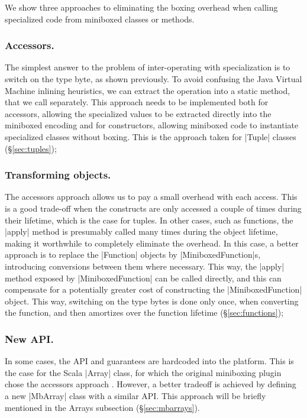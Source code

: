 \vspace{-0.25em}

We show three approaches to eliminating the boxing overhead when calling specialized code from miniboxed classes or methods.

\vspace{-0.5em}

\subsubsection{Accessors.} The simplest answer to the problem of inter-operating with specialization is to switch on the type byte, as shown previously. To avoid confusing the Java Virtual Machine inlining heuristics, we can extract the operation into a static method, that we call separately. This approach needs to be implemented both for accessors, allowing the specialized values to be extracted directly into the miniboxed encoding and for constructors, allowing miniboxed code to instantiate specialized classes without boxing. This is the approach taken for |Tuple| classes (\S\ref{sec:tuples});

\vspace{-0.5em}

\subsubsection{Transforming objects.} The accessors approach allows us to pay a small overhead with each access. This is a good trade-off when the constructs are only accessed a couple of times during their lifetime, which is the case for tuples. In other cases, such as functions, the |apply| method is presumably called many times during the object lifetime, making it worthwhile to completely eliminate the overhead. In this case, a better approach is to replace the |Function| objects by |MiniboxedFunction|s, introducing conversions between them where necessary. This way, the |apply| method exposed by |MiniboxedFunction| can be called directly, and this can compensate for a potentially greater cost of constructing the |MiniboxedFunction| object. This way, switching on the type bytes is done only once, when converting the function, and then amortizes over the function lifetime (\S\ref{sec:functions});

\vspace{-0.5em}

\subsubsection{New API.} In some cases, the API and guarantees are hardcoded into the platform. This is the case for the Scala |Array| class, for which the original miniboxing plugin chose the accessors approach \cite{miniboxing}. However, a better tradeoff is achieved by defining a new |MbArray| class with a similar API. This approach will be briefly mentioned in the Arrays subsection (\S\ref{sec:mbarrays}).


